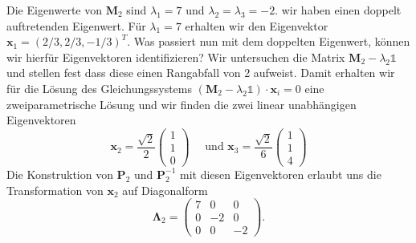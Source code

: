 Die Eigenwerte von $\mathbf{M}_2$ sind $\lambda_1=7$ und $\lambda_2=\lambda_3=-2$. wir haben einen doppelt auftretenden Eigenwert. Für $\lambda_1=7$ erhalten wir den Eigenvektor $\mathbf{x}_1=(2/3,2/3,-1/3)^T$. Was passiert nun mit dem doppelten Eigenwert, können wir hierfür Eigenvektoren identifizieren? Wir untersuchen die Matrix  $\mathbf{M}_2-\lambda_{2}\mathds{1}$ und stellen fest dass diese einen Rangabfall von 2 aufweist. Damit erhalten wir für die Lösung des Gleichungssystems $(\mathbf{M}_2-\lambda_{2}\mathds{1})\cdot\mathbf{x}_i=0$ eine zweiparametrische Lösung und wir finden die zwei linear unabhängigen Eigenvektoren
\[
\mathbf{x}_2=\frac{\sqrt{2}}{2}
\begin{pmatrix}1\\ 1\\ 0\end{pmatrix}
\quad\text{ und }
\mathbf{x}_3=\frac{\sqrt{2}}{6}
\begin{pmatrix}1\\ 1\\ 4\end{pmatrix}
\]
Die Konstruktion von $\mathbf{P}_2$ und $\mathbf{P}_2^{-1}$ mit diesen Eigenvektoren erlaubt uns die Transformation von $\mathbf{x}_2$ auf Diagonalform
\[
\bm{\Lambda}_2=
\begin{pmatrix}7&0&0\\0&-2&0\\0&0&-2\end{pmatrix}.
\]

